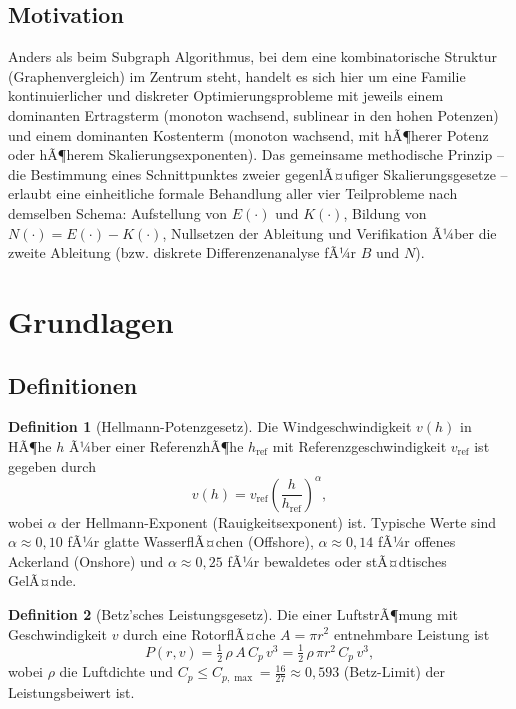 ﻿\documentclass[a4paper,12pt]{article}
\theoremstyle{definition}
\newtheorem{definition}{Definition}
\begin{document}
\subsection{Motivation}

Anders als beim Subgraph Algorithmus, bei dem eine kombinatorische Struktur (Graphenvergleich) im Zentrum steht, handelt es sich hier um eine Familie kontinuierlicher und diskreter Optimierungsprobleme mit jeweils einem dominanten Ertragsterm (monoton wachsend, sublinear in den hohen Potenzen) und einem dominanten Kostenterm (monoton wachsend, mit hÃ¶herer Potenz oder hÃ¶herem Skalierungsexponenten). Das gemeinsame methodische Prinzip -- die Bestimmung eines Schnittpunktes zweier gegenlÃ¤ufiger Skalierungsgesetze -- erlaubt eine einheitliche formale Behandlung aller vier Teilprobleme nach demselben Schema: Aufstellung von $E(\cdot)$ und $K(\cdot)$, Bildung von $N(\cdot) = E(\cdot)-K(\cdot)$, Nullsetzen der Ableitung und Verifikation Ã¼ber die zweite Ableitung (bzw. diskrete Differenzenanalyse fÃ¼r $B$ und $N$).

\section{Grundlagen}

\subsection{Definitionen}

\begin{definition}[Hellmann-Potenzgesetz]
\label{def:hellmann}
Die Windgeschwindigkeit $v(h)$ in HÃ¶he $h$ Ã¼ber einer ReferenzhÃ¶he $h_{\mathrm{ref}}$ mit Referenzgeschwindigkeit $v_{\mathrm{ref}}$ ist gegeben durch
\[
v(h) = v_{\mathrm{ref}} \left(\frac{h}{h_{\mathrm{ref}}}\right)^{\alpha},
\]
wobei $\alpha$ der Hellmann-Exponent (Rauigkeitsexponent) ist. Typische Werte sind $\alpha \approx 0{,}10$ fÃ¼r glatte WasserflÃ¤chen (Offshore), $\alpha \approx 0{,}14$ fÃ¼r offenes Ackerland (Onshore) und $\alpha \approx 0{,}25$ fÃ¼r bewaldetes oder stÃ¤dtisches GelÃ¤nde.
\end{definition}

\begin{definition}[Betz'sches Leistungsgesetz]
\label{def:betz}
Die einer LuftstrÃ¶mung mit Geschwindigkeit $v$ durch eine RotorflÃ¤che $A = \pi r^2$ entnehmbare Leistung ist
\[
P(r, v) = \tfrac{1}{2}\,\rho\, A\, C_p\, v^3 = \tfrac{1}{2}\,\rho\, \pi r^2\, C_p\, v^3,
\]
wobei $\rho$ die Luftdichte und $C_p \le C_{p,\max} = \tfrac{16}{27} \approx 0{,}593$ (Betz-Limit) der Leistungsbeiwert ist.
\end{definition}
\end{document}
